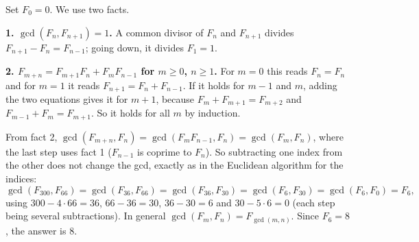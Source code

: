 Set $F_0=0$. We use two facts.

\textbf{1. $\gcd(F_n,F_{n+1})=1$.} A common divisor of $F_n$ and $F_{n+1}$ divides $F_{n+1}-F_n=F_{n-1}$; going down, it divides $F_1=1$.

\textbf{2. $F_{m+n}=F_{m+1}F_n+F_mF_{n-1}$ for $m\ge0$, $n\ge1$.} For $m=0$ this reads $F_n=F_n$ and for $m=1$ it reads $F_{n+1}=F_n+F_{n-1}$. If it holds for $m-1$ and $m$, adding the two equations gives it for $m+1$, because $F_m+F_{m+1}=F_{m+2}$ and $F_{m-1}+F_m=F_{m+1}$. So it holds for all $m$ by induction.

From fact 2, $\gcd(F_{m+n},F_n)=\gcd(F_mF_{n-1},F_n)=\gcd(F_m,F_n)$, where the last step uses fact 1 ($F_{n-1}$ is coprime to $F_n$). So subtracting one index from the other does not change the gcd, exactly as in the Euclidean algorithm for the indices:
\[
\gcd(F_{300},F_{66})=\gcd(F_{36},F_{66})=\gcd(F_{36},F_{30})=\gcd(F_6,F_{30})=\gcd(F_6,F_0)=F_6 ,
\]
using $300-4\cdot66=36$, $66-36=30$, $36-30=6$ and $30-5\cdot6=0$ (each step being several subtractions). In general $\gcd(F_m,F_n)=F_{\gcd(m,n)}$. Since $F_6=8$, the answer is $\boxed{8}$.

